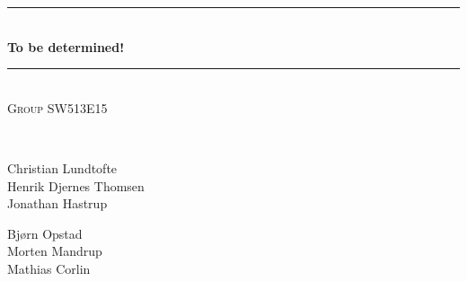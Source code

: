 \documentclass[pdftex,12pt,a4paper]{report}
\newcommand{\HRule}{\rule{\linewidth}{0.5mm}}
\begin{document}
\begin{titlepage}
\begin{center}


\HRule \\[0.4cm]
{ \huge \bfseries To be determined!\\[0.4cm] }

\HRule \\[1.5cm]

\textsc{Group SW513E15}

\begin{figure}[!h]
	\centering
\end{figure}

\textsc{\Large }\\[0.5cm]
\begin{minipage}{0.4\textwidth}
\begin{flushleft} \large
Christian Lundtofte\\
Henrik Djernes Thomsen\\
Jonathan Hastrup\\
\end{flushleft}
\end{minipage}
\begin{minipage}{0.4\textwidth}
\begin{flushright} \large
Bjørn Opstad\\
Morten Mandrup\\
Mathias Corlin
\end{flushright}
\end{minipage}

\vfill



\end{center}
\end{titlepage}
\end{document}
